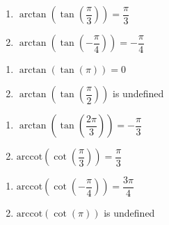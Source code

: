 \begin{multicols}{2}

\begin{enumerate}

\setcounter{enumi}{\value{HW}}

\item  $\arctan\left(\tan\left(\dfrac{\pi}{3}\right) \right) = \dfrac{\pi}{3}$
\item  $\arctan\left(\tan\left(-\dfrac{\pi}{4}\right) \right) = -\dfrac{\pi}{4}$

\setcounter{HW}{\value{enumi}}

\end{enumerate}

\end{multicols}

\begin{multicols}{2}

\begin{enumerate}

\setcounter{enumi}{\value{HW}}

\item  $\arctan\left(\tan\left(\pi\right) \right) = 0$ 
\item  $\arctan\left(\tan\left(\dfrac{\pi}{2}\right) \right)$ is undefined

\setcounter{HW}{\value{enumi}}

\end{enumerate}

\end{multicols}

\begin{multicols}{2}

\begin{enumerate}

\setcounter{enumi}{\value{HW}}

\item  $\arctan\left(\tan\left(\dfrac{2\pi}{3}\right) \right) = -\dfrac{\pi}{3}$
\item  $\text{arccot}\left(\cot\left(\dfrac{\pi}{3}\right) \right) = \dfrac{\pi}{3}$ 

\setcounter{HW}{\value{enumi}}

\end{enumerate}

\end{multicols}

\begin{multicols}{2}

\begin{enumerate}

\setcounter{enumi}{\value{HW}}

\item  $\text{arccot}\left(\cot\left(-\dfrac{\pi}{4}\right) \right) = \dfrac{3\pi}{4}$
\item  $\text{arccot}\left(\cot\left(\pi\right) \right)$ is undefined 

\setcounter{HW}{\value{enumi}}

\end{enumerate}

\end{multicols}

